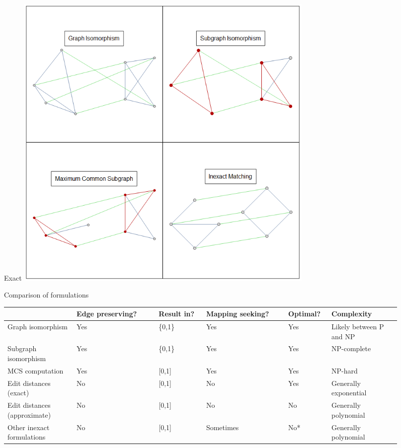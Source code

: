 \documentclass[xcolor=dvipsnames, 14pt]{beamer}
\begin{document}
\begin{frame}{Exact}
\centering
\includegraphics[width=0.65\textwidth]{isomorphism_demos.png}
\end{frame}


\begin{frame}{Comparison of formulations}
\centering
\scriptsize
\setlength\extrarowheight{3pt}\setlength{\tabcolsep}{1pt}
\begin{tabular}{|L{0.16\linewidth}|C{0.19\linewidth}|C{0.11\linewidth}|C{0.195\linewidth}|C{0.105\linewidth}|C{0.165\linewidth}|}
\hline
 & Edge preserving? & Result in? & Mapping seeking? & Optimal? & Complexity \\ \hline\hline
Graph isomorphism & Yes & \{0,1\} & Yes & Yes & Likely between P and NP \\ \hline
Subgraph isomorphism & Yes & \{0,1\} & Yes & Yes & NP-complete \\ \hline
MCS computation & Yes & [0,1] & Yes & Yes & NP-hard \\ \hline
Edit distances (exact) & No & [0,1] & No & Yes & Generally exponential \\ \hline
Edit distances (approximate) & No & [0,1] & No & No & Generally polynomial \\ \hline
Other inexact formulations & No & [0,1] & Sometimes & No* & Generally polynomial \\ \hline
\end{tabular}
\end{frame}
\end{document}
